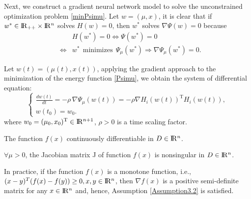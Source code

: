 \documentclass[12pt]{article}
\renewcommand{\Re}{{\rm I}\! {\rm R}}
\newcommand{\rn}{\Re^n}
\newcommand{\ds}{\displaystyle}
\begin{document}
\medskip

Next, we construct a gradient neural network model to solve the unconstrained 
optimization problem \eqref{minPsimu}.
 Let $w=(\mu,x)$, it  is clear  that if
 $w^{*}\in \Re_{++}\times \Re^{n}$ solves $H(w)=0$, then $w^{*}$ solves
 $ \nabla \Psi(w) =0$ because
 \begin{eqnarray*}
 &  &  H(w^{*})=0
  \Longleftrightarrow   \Psi(w^{*})=0 \\
 & \Longleftrightarrow &  w^{*} \ \  \mbox{minimizes} \ \ \Psi_\mu(w^{*})
   \Longrightarrow         \nabla \Psi_\mu(w^{*}) = 0.
 \end{eqnarray*}

 \medskip

 Let $w(t)=(\mu(t),x(t))$, applying the gradient approach to the
 minimization of the energy function \eqref{Psimu},
 we obtain the system of differential equation:
 \begin{equation} \label{ANN}
    \left \{
    \begin{array}{l}
                \ds \frac{dw(t)}{dt} = -\rho \, \nabla  \Psi_\mu(w(t))
                = -\rho \nabla H_i(w(t))^{\mathrm{T}} H_i(w(t)), \\
                w(t_0) = w_0.
    \end{array}
    \right.
 \end{equation}
 where $w_0=(\mu_0, x_0)^{\mathrm{T}} \in \Re^{n+1}$, $\rho>0$
 is a time scaling factor.

 \medskip

 \begin{assumption} \label{Assumption3.1}
 The function $f(x)$ continuously  differentiable in $D \in \rn$.
 \end{assumption}
 \begin{assumption} \label{Assumption3.2}
 $\forall \mu > 0$, the Jacobian matrix J of function  $f(x)$ is nonsingular in $D \in \rn$.
 \end{assumption}

In practice, if the function $f(x)$ is a monotone function,
i.e.,$(x-y)^{T} (f(x)-f(y)) \geq 0, x,y \in \rn$,
then $\nabla f(x)$ is a positive semi-definite matrix for
any $x \in \rn$ and, hence, Assumption \ref{Assumption3.2} is
satisfied.

 \medskip
\end{document}
